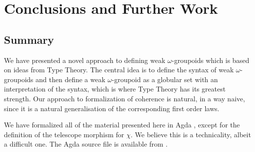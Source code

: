 \section{Conclusions and Further Work}
\label{sec:conclusions}

\subsection{Summary}
We have presented a novel approach to defining weak $\omega$-groupoids
which is based on ideas from Type Theory. The central idea is to
define the syntax of weak $\omega$-groupoids and then define a weak
$\omega$-groupoid as a globular set with an interpretation of the
syntax, which is where Type Theory has its greatest strength. Our
approach to formalization of coherence is natural, in a way naive,
since it is a natural generalisation of the corresponding first order
laws.

We have formalized all of the material presented here in Agda
\cite{agda}, except for the definition of the telescope morphism for
$\chi$.
We believe this is
a technicality, albeit a difficult one. The Agda source file is available
from \cite{coreagda}.


